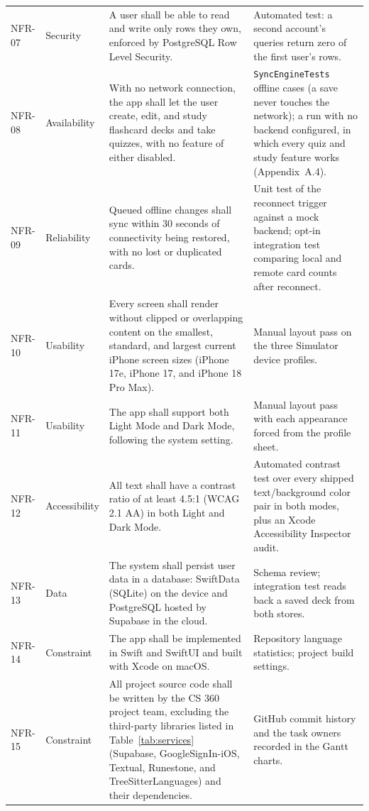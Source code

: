 \documentclass[12pt,letterpaper]{article}
\begin{document}
\begin{xltabular}{\textwidth}{@{}l L{2.1cm} Y L{4.3cm}@{}}
NFR-07 & Security & A user shall be able to read and write only rows they own, enforced by PostgreSQL Row Level Security. & Automated test: a second account's queries return zero of the first user's rows. \\
NFR-08 & Availability & With no network connection, the app shall let the user create, edit, and study flashcard decks and take quizzes, with no feature of either disabled. & \texttt{SyncEngineTests} offline cases (a save never touches the network); a run with no backend configured, in which every quiz and study feature works (Appendix~A.4). \\
NFR-09 & Reliability & Queued offline changes shall sync within 30 seconds of connectivity being restored, with no lost or duplicated cards. & Unit test of the reconnect trigger against a mock backend; opt-in integration test comparing local and remote card counts after reconnect. \\
NFR-10 & Usability & Every screen shall render without clipped or overlapping content on the smallest, standard, and largest current iPhone screen sizes (iPhone 17e, iPhone 17, and iPhone 18 Pro Max). & Manual layout pass on the three Simulator device profiles. \\
NFR-11 & Usability & The app shall support both Light Mode and Dark Mode, following the system setting. & Manual layout pass with each appearance forced from the profile sheet. \\
NFR-12 & Accessibility & All text shall have a contrast ratio of at least 4.5:1 (WCAG 2.1 AA) in both Light and Dark Mode. & Automated contrast test over every shipped text/background color pair in both modes, plus an Xcode Accessibility Inspector audit. \\
NFR-13 & Data & The system shall persist user data in a database: SwiftData (SQLite) on the device and PostgreSQL hosted by Supabase in the cloud. & Schema review; integration test reads back a saved deck from both stores. \\
NFR-14 & Constraint & The app shall be implemented in Swift and SwiftUI and built with Xcode on macOS. & Repository language statistics; project build settings. \\
NFR-15 & Constraint & All project source code shall be written by the CS 360 project team, excluding the third-party libraries listed in Table~\ref{tab:services} (Supabase, GoogleSignIn-iOS, Textual, Runestone, and TreeSitterLanguages) and their dependencies. & GitHub commit history and the task owners recorded in the Gantt charts. \\

\end{xltabular}
\end{document}
